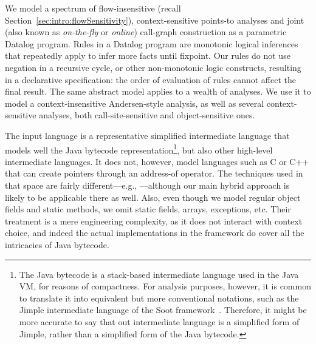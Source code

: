 We model a spectrum of flow-insensitive (recall Section~\ref{sec:intro:flowSensitivity}), context-sensitive points-to analyses and joint (also known as \emph{on-the-fly} or \emph{online}) call-graph construction as a parametric Datalog program. Rules in a Datalog program are monotonic logical inferences that repeatedly apply to infer more facts until fixpoint. Our rules do not use negation in a recursive cycle, or other non-monotonic logic constructs, resulting in a declarative specification: the order of evaluation of rules cannot affect the final result. The same abstract model applies to a wealth of analyses. We use it to model a context-insensitive Andersen-style \cite{thesis:Andersen} analysis, as well as several context-sensitive analyses, both call-site-sensitive and object-sensitive ones.

The input language is a representative simplified intermediate language that models well the Java bytecode representation\footnote{The Java bytecode is a stack-based intermediate language used in the Java VM, for reasons of compactness. For analysis purposes, however, it is common to translate it into equivalent but more conventional notations, such as the Jimple intermediate language of the Soot framework~\cite{cascon:1999:Vall,cc:2000:Vall}. Therefore, it might be more accurate to say that out intermediate language is a simplified form of Jimple, rather than a simplified form of the Java bytecode.}, but also other high-level intermediate languages. It does not, however, model languages such as C or C++ that can create pointers through an address-of operator. The techniques used in that space are fairly different---e.g., \cite{pldi:2007:Hardekopf,popl:2009:Hardekopf}---although our main hybrid approach is likely to be applicable there as well. Also, even though we model regular object fields and static methods, we omit static fields, arrays, exceptions, etc. Their treatment is a mere engineering complexity, as it does not interact with context choice, and indeed the actual implementations in the \doop{} framework do cover all the intricacies of Java bytecode.


